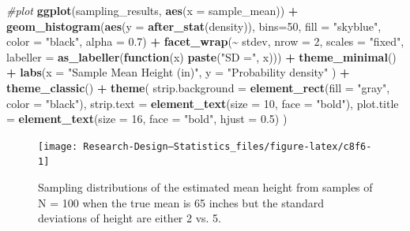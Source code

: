 \documentclass[
]{book}
\newenvironment{Shaded}{\begin{snugshade}}{\end{snugshade}}
\newcommand{\AttributeTok}[1]{\textcolor[rgb]{0.13,0.29,0.53}{#1}}
\newcommand{\CommentTok}[1]{\textcolor[rgb]{0.56,0.35,0.01}{\textit{#1}}}
\newcommand{\ControlFlowTok}[1]{\textcolor[rgb]{0.13,0.29,0.53}{\textbf{#1}}}
\newcommand{\DecValTok}[1]{\textcolor[rgb]{0.00,0.00,0.81}{#1}}
\newcommand{\FloatTok}[1]{\textcolor[rgb]{0.00,0.00,0.81}{#1}}
\newcommand{\FunctionTok}[1]{\textcolor[rgb]{0.13,0.29,0.53}{\textbf{#1}}}
\newcommand{\NormalTok}[1]{#1}
\newcommand{\SpecialCharTok}[1]{\textcolor[rgb]{0.81,0.36,0.00}{\textbf{#1}}}
\newcommand{\StringTok}[1]{\textcolor[rgb]{0.31,0.60,0.02}{#1}}
\begin{document}
\begin{Shaded}
\begin{Highlighting}[]
\CommentTok{\#plot}
\FunctionTok{ggplot}\NormalTok{(sampling\_results, }\FunctionTok{aes}\NormalTok{(}\AttributeTok{x =}\NormalTok{ sample\_mean)) }\SpecialCharTok{+}
  \FunctionTok{geom\_histogram}\NormalTok{(}\FunctionTok{aes}\NormalTok{(}\AttributeTok{y =} \FunctionTok{after\_stat}\NormalTok{(density)), }\AttributeTok{bins=}\DecValTok{50}\NormalTok{, }\AttributeTok{fill =} \StringTok{"skyblue"}\NormalTok{, }\AttributeTok{color =} \StringTok{"black"}\NormalTok{, }\AttributeTok{alpha =} \FloatTok{0.7}\NormalTok{) }\SpecialCharTok{+}
  \FunctionTok{facet\_wrap}\NormalTok{(}\SpecialCharTok{\textasciitilde{}}\NormalTok{ stdev, }\AttributeTok{nrow =} \DecValTok{2}\NormalTok{, }\AttributeTok{scales =} \StringTok{"fixed"}\NormalTok{,}
               \AttributeTok{labeller =} \FunctionTok{as\_labeller}\NormalTok{(}\ControlFlowTok{function}\NormalTok{(x) }\FunctionTok{paste}\NormalTok{(}\StringTok{"SD ="}\NormalTok{, x))) }\SpecialCharTok{+}
  \FunctionTok{theme\_minimal}\NormalTok{() }\SpecialCharTok{+}
  \FunctionTok{labs}\NormalTok{(}\AttributeTok{x =} \StringTok{"Sample Mean Height (in)"}\NormalTok{, }\AttributeTok{y =} \StringTok{"Probability density"}\NormalTok{ ) }\SpecialCharTok{+}
  \FunctionTok{theme\_classic}\NormalTok{() }\SpecialCharTok{+}
  \FunctionTok{theme}\NormalTok{(}
    \AttributeTok{strip.background =} \FunctionTok{element\_rect}\NormalTok{(}\AttributeTok{fill =} \StringTok{"gray"}\NormalTok{, }\AttributeTok{color =} \StringTok{"black"}\NormalTok{), }
    \AttributeTok{strip.text =} \FunctionTok{element\_text}\NormalTok{(}\AttributeTok{size =} \DecValTok{10}\NormalTok{, }\AttributeTok{face =} \StringTok{"bold"}\NormalTok{),}
    \AttributeTok{plot.title =} \FunctionTok{element\_text}\NormalTok{(}\AttributeTok{size =} \DecValTok{16}\NormalTok{, }\AttributeTok{face =} \StringTok{"bold"}\NormalTok{, }\AttributeTok{hjust =} \FloatTok{0.5}\NormalTok{)}
\NormalTok{  )}
\end{Highlighting}
\end{Shaded}

\begin{figure}

{\centering \texttt{[image: Research-Design---Statistics\_files/figure-latex/c8f6-1]} 

}

\caption{Sampling distributions of the estimated mean height from samples of N = 100 when the true mean is 65 inches but the standard deviations of height are either 2 vs. 5.}\label{fig:c8f6}
\end{figure}
\end{document}
